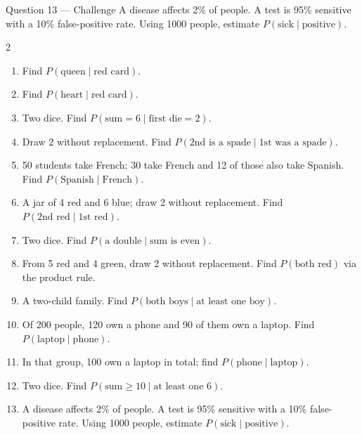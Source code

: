 \documentclass[11pt]{article}
\begin{document}
\begin{qbox}{Question 13 --- Challenge}
A disease affects 2\% of people. A test is 95\% sensitive with a 10\% false-positive rate. Using 1000 people, estimate $P(\text{sick}\mid\text{positive})$.\workspace{3.4cm}
\end{qbox}

\clearpage
{}

\begin{recapbox}
\begin{multicols}{2}
\small
\begin{enumerate}[leftmargin=*,itemsep=3pt]
  \item Find $P(\text{queen}\mid\text{red card})$.
  \item Find $P(\text{heart}\mid\text{red card})$.
  \item Two dice. Find $P(\text{sum}=6\mid\text{first die}=2)$.
  \item Draw 2 without replacement. Find $P(\text{2nd is a spade}\mid\text{1st was a spade})$.
  \item 50 students take French; 30 take French and 12 of those also take Spanish. Find $P(\text{Spanish}\mid\text{French})$.
  \item A jar of 4 red and 6 blue; draw 2 without replacement. Find $P(\text{2nd red}\mid\text{1st red})$.
  \item Two dice. Find $P(\text{a double}\mid\text{sum is even})$.
  \item From 5 red and 4 green, draw 2 without replacement. Find $P(\text{both red})$ via the product rule.
  \item A two-child family. Find $P(\text{both boys}\mid\text{at least one boy})$.
  \item Of 200 people, 120 own a phone and 90 of them own a laptop. Find $P(\text{laptop}\mid\text{phone})$.
  \item In that group, 100 own a laptop in total; find $P(\text{phone}\mid\text{laptop})$.
  \item Two dice. Find $P(\text{sum}\ge10\mid\text{at least one 6})$.
  \item A disease affects 2\% of people. A test is 95\% sensitive with a 10\% false-positive rate. Using 1000 people, estimate $P(\text{sick}\mid\text{positive})$.
\end{enumerate}
\end{multicols}
\end{recapbox}
\end{document}
